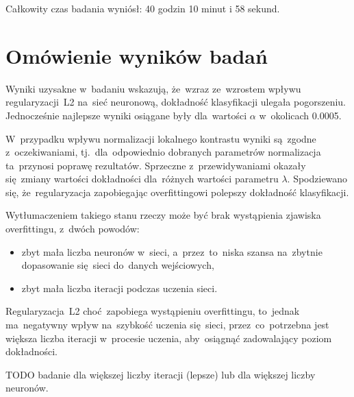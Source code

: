 Całkowity czas badania wyniósł: 40 godzin 10 minut i 58 sekund.

\section{Omówienie wyników badań}
Wyniki uzysakne w~badaniu wskazują, że~wzraz ze~wzrostem wpływu regularyzacji~L2 na~sieć neuronową, dokładność
klasyfikacji ulegała pogorszeniu. Jednocześnie najlepsze wyniki osiągane były dla~wartości $\alpha$ w~okolicach 0.0005.

W~przypadku wpływu normalizacji lokalnego kontrastu wyniki są~zgodne z~oczekiwaniami, tj.~dla~odpowiednio dobranych
parametrów normalizacja ta~przynosi poprawę rezultatów. Sprzeczne z~przewidywaniami okazały się~zmiany wartości
dokładności dla~różnych wartości parametru $\lambda$. Spodziewano się, że~regularyzacja zapobiegając overfittingowi
polepszy dokładność klasyfikacji.

Wytłumaczeniem takiego stanu rzeczy może być brak wystąpienia zjawiska overfittingu, z~dwóch powodów:
\begin{itemize}
    \item zbyt mała liczba neuronów w~sieci, a~przez~to~niska szansa na~zbytnie dopasowanie się~sieci do~danych
          wejściowych,
    \item zbyt mała liczba iteracji podczas uczenia sieci.
\end{itemize}
Regularyzacja~L2 choć~zapobiega wystąpieniu overfittingu, to~jednak ma~negatywny wpływ na~szybkość uczenia się~sieci,
przez~co~potrzebna jest większa liczba iteracji w~procesie uczenia, aby~osiągnąć zadowalający poziom dokładności.

TODO badanie dla większej liczby iteracji (lepsze) lub dla większej liczby neuronów.
